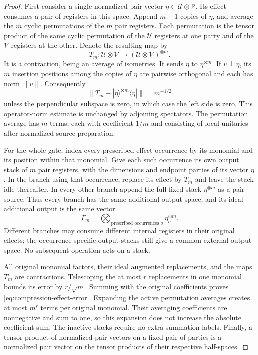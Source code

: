 \documentclass[11pt]{article}
\numberwithin{equation}{section}
\theoremstyle{definition}
\theoremstyle{remark}
\begin{document}
\begin{proof}
First consider a single normalized pair vector
$\eta\in\mathcal U\otimes\mathcal V$.  Its effect consumes a pair of
registers in this space.  Append $m-1$ copies of $\eta$, and average the
$m$ cyclic permutations of the $m$ pair registers.  Each permutation is
the tensor product of the same cyclic permutation of the $\mathcal U$
registers at one party and of the $\mathcal V$ registers at the other.
Denote the resulting map by
\[
 T_m:\mathcal U\otimes\mathcal V
       \longrightarrow(\mathcal U\otimes\mathcal V)^{\otimes m}.
\]
It is a contraction, being an average of isometries.  It sends $\eta$ to
$\eta^{\otimes m}$.  If $v\perp\eta$, its $m$ insertion positions among
the copies of $\eta$ are pairwise orthogonal and each has norm
$\lVert v\rVert$.  Consequently
\begin{equation}
 \lVert T_m-|\eta\rangle^{\otimes m}\langle\eta|\rVert
       =m^{-1/2}
 \label{eq:compression-one-effect}
\end{equation}
unless the perpendicular subspace is zero, in which case the left side
is zero.  This operator-norm estimate is unchanged by adjoining
spectators.  The permutation average has $m$ terms, each with coefficient
$1/m$ and consisting of local unitaries after normalized source
preparation.

For the whole gate, index every prescribed effect occurrence by its
monomial and its position within that monomial.  Give each such
occurrence its own output stack of $m$ pair registers, with the dimensions
and endpoint parties of its vector $\eta$.  In the branch using that
occurrence, replace its effect by $T_m$ and leave the stack idle
thereafter.  In every other branch append the full fixed stack
$\eta^{\otimes m}$ as a pair source.  Thus every branch has the same
additional output space, and its ideal additional output is the same
vector
\[
 \Gamma_m=\bigotimes_{\text{prescribed occurrences }o}
                    \eta_o^{\otimes m}.
\]
Different branches may consume different internal registers in their
original effects; the occurrence-specific output stacks still give a
common external output space.  No subsequent operation acts on a stack.

All original monomial factors, their ideal augmented replacements, and
the maps $T_m$ are contractions.  Telescoping the at most $r$ replacements
in one monomial bounds its error by $r/\sqrt m$.  Summing with the
original coefficients proves
\eqref{eq:compression-effect-error}.  Expanding the active permutation
averages creates at most $m^r$ terms per original monomial.  Their
averaging coefficients are nonnegative and sum to one, so this expansion
does not increase the absolute coefficient sum.  The inactive stacks
require no extra summation labels.  Finally, a tensor product of
normalized pair vectors on a fixed pair of parties is a normalized pair
vector on the tensor products of their respective half-spaces.
\end{proof}
\end{document}
